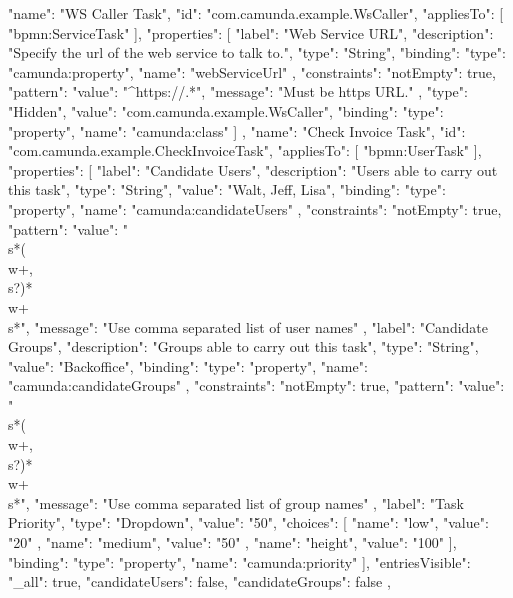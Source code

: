   {
    "name": "WS Caller Task",
    "id": "com.camunda.example.WsCaller",
    "appliesTo": [
      "bpmn:ServiceTask"
    ],
    "properties": [
      {
        "label": "Web Service URL",
        "description": "Specify the url of the web service to talk to.",
        "type": "String",
        "binding": {
          "type": "camunda:property",
          "name": "webServiceUrl"
        },
        "constraints": {
          "notEmpty": true,
          "pattern": {
            "value": "^https://.*",
            "message": "Must be https URL."
          }
        }
      },
      {
        "type": "Hidden",
        "value": "com.camunda.example.WsCaller",
        "binding": {
          "type": "property",
          "name": "camunda:class"
        }
      }
    ]
  },
  {
    "name": "Check Invoice Task",
    "id": "com.camunda.example.CheckInvoiceTask",
    "appliesTo": [
      "bpmn:UserTask"
    ],
    "properties": [
      {
        "label": "Candidate Users",
        "description": "Users able to carry out this task",
        "type": "String",
        "value": "Walt, Jeff, Lisa",
        "binding": {
          "type": "property",
          "name": "camunda:candidateUsers"
        },
        "constraints": {
          "notEmpty": true,
          "pattern": {
            "value": "\\s*(\\w+,\\s?)*\\w+\\s*",
            "message": "Use comma separated list of user names"
          }
        }
      },
      {
        "label": "Candidate Groups",
        "description": "Groups able to carry out this task",
        "type": "String",
        "value": "Backoffice",
        "binding": {
          "type": "property",
          "name": "camunda:candidateGroups"
        },
        "constraints": {
          "notEmpty": true,
          "pattern": {
            "value": "\\s*(\\w+,\\s?)*\\w+\\s*",
            "message": "Use comma separated list of group names"
          }
        }
      },
      {
        "label": "Task Priority",
        "type": "Dropdown",
        "value": "50",
        "choices": [
          { "name": "low", "value": "20" },
          { "name": "medium", "value": "50" },
          { "name": "height", "value": "100" }
        ],
        "binding": {
          "type": "property",
          "name": "camunda:priority"
        }
      }
    ],
    "entriesVisible": {
      "_all": true,
      "candidateUsers": false,
      "candidateGroups": false
    }
  },
